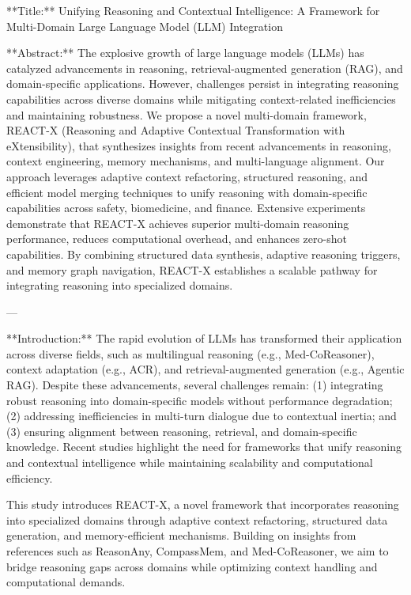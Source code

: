 **Title:**  
Unifying Reasoning and Contextual Intelligence: A Framework for Multi-Domain Large Language Model (LLM) Integration  

**Abstract:**  
The explosive growth of large language models (LLMs) has catalyzed advancements in reasoning, retrieval-augmented generation (RAG), and domain-specific applications. However, challenges persist in integrating reasoning capabilities across diverse domains while mitigating context-related inefficiencies and maintaining robustness. We propose a novel multi-domain framework, REACT-X (Reasoning and Adaptive Contextual Transformation with eXtensibility), that synthesizes insights from recent advancements in reasoning, context engineering, memory mechanisms, and multi-language alignment. Our approach leverages adaptive context refactoring, structured reasoning, and efficient model merging techniques to unify reasoning with domain-specific capabilities across safety, biomedicine, and finance. Extensive experiments demonstrate that REACT-X achieves superior multi-domain reasoning performance, reduces computational overhead, and enhances zero-shot capabilities. By combining structured data synthesis, adaptive reasoning triggers, and memory graph navigation, REACT-X establishes a scalable pathway for integrating reasoning into specialized domains.  

---

**Introduction:**  
The rapid evolution of LLMs has transformed their application across diverse fields, such as multilingual reasoning (e.g., Med-CoReasoner), context adaptation (e.g., ACR), and retrieval-augmented generation (e.g., Agentic RAG). Despite these advancements, several challenges remain: (1) integrating robust reasoning into domain-specific models without performance degradation; (2) addressing inefficiencies in multi-turn dialogue due to contextual inertia; and (3) ensuring alignment between reasoning, retrieval, and domain-specific knowledge. Recent studies highlight the need for frameworks that unify reasoning and contextual intelligence while maintaining scalability and computational efficiency.  

This study introduces REACT-X, a novel framework that incorporates reasoning into specialized domains through adaptive context refactoring, structured data generation, and memory-efficient mechanisms. Building on insights from references such as ReasonAny, CompassMem, and Med-CoReasoner, we aim to bridge reasoning gaps across domains while optimizing context handling and computational demands.  


